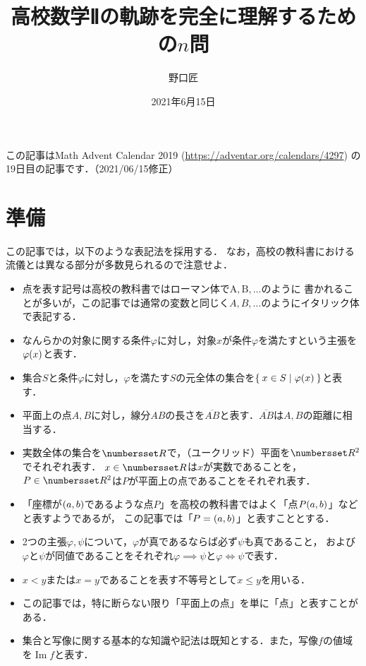 \documentclass[11pt,a4paper]{ltjsarticle}
\title{高校数学Ⅱの軌跡を完全に理解するための$n$問}
\author{野口匠}
\date{2021年6月15日}
\newcommand*{\length}[1]{\overline{#1}}
\newcommand*{\equivalent}{\Longleftrightarrow}
\newcommand*{\coord}[1]{\paren{#1}}
\DeclareMathOperator{\Image}{Im}
\theoremstyle{definition}
\begin{document}
%
\maketitle

この記事はMath Advent Calendar 2019 (\url{https://adventar.org/calendars/4297}) の19日目の記事です．（2021/06/15修正）

\section{準備} \label{sec:pre}

この記事では，以下のような表記法を採用する．
なお，高校の教科書における流儀とは異なる部分が多数見られるので注意せよ．

\begin{itemize}
  \item 点を表す記号は高校の教科書ではローマン体で$\mathrm{A}, \mathrm{B}, \dotsc$のように
        書かれることが多いが，この記事では通常の変数と同じく$A,B, \dotsc$のようにイタリック体で表記する．
  \item なんらかの対象に関する条件$\varphi$に対し，対象$x$が条件$\varphi$を満たすという主張を$\apply{\varphi}{x}$と表す．
  \item 集合$S$と条件$\varphi$に対し，$\varphi$を満たす$S$の元全体の集合を$\setintension{x \in S}{\apply{\varphi}{x}}$と表す．
  \item 平面上の点$A,B$に対し，線分$AB$の長さを$\length{AB}$と表す．$\length{AB}$は$A,B$の距離に相当する．
  \item 実数全体の集合を$\Real$で，（ユークリッド）平面を$\Real ^2$でそれぞれ表す．
        $x \in \Real$は$x$が実数であることを，$P \in \Real ^2$は$P$が平面上の点であることをそれぞれ表す．
  \item 「座標が$\coord{a,b}$であるような点$P$」を高校の教科書ではよく「点$P{\coord{a,b}}$」などと表すようであるが，
        この記事では「$P = \coord{a,b}$」と表すこととする．
  \item 2つの主張$\varphi, \psi$について，$\varphi$が真であるならば必ず$\psi$も真であること，
        および$\varphi$と$\psi$が同値であることをそれぞれ$\varphi \implies \psi$と$\varphi \equivalent \psi$で表す．
  \item $x < y$または$x = y$であることを表す不等号として$x \leq y$を用いる．
  \item この記事では，特に断らない限り「平面上の点」を単に「点」と表すことがある．
  \item 集合と写像に関する基本的な知識や記法は既知とする．また，写像$f$の値域を$\Image f$と表す．
\end{itemize}
\end{document}
